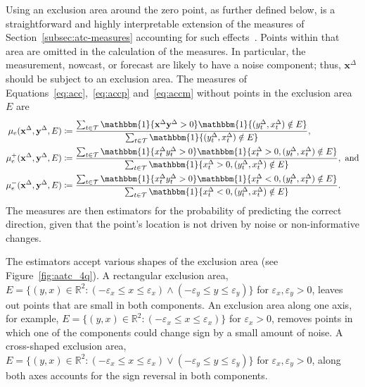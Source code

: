 \documentclass[pdflatex]{sn-jnl}
\theoremstyle{plain}%
\theoremstyle{definition}
\newcommand{\ind}[1]{\mathbbm{1}\{#1\}}
\newcommand{\R}{\mathbb{R}}
\newcommand{\diffx}{\mathbf{x}^{\Delta}}
\newcommand{\diffy}{\mathbf{y}^{\Delta}}
\newcommand{\diffxt}[1][t]{x^{\Delta}_{#1}}
\newcommand{\diffyt}[1][t]{y^{\Delta}_{#1}}
\newcommand{\acc}{\mu}
\newcommand{\acceps}[1][e]{\acc_{#1}} %
\newcommand{\accpeps}[1][e]{\acceps[#1]^+}
\newcommand{\accmeps}[1][e]{\acceps[#1]^-}
\begin{document}
Using an exclusion area around the zero point, as further defined below, is a straightforward and highly interpretable extension of the measures of Section~\ref{subsec:atc-measures} accounting for such effects~\citep[see, e.g.,][]{Saugel2015, Critchley2010}.
Points within that area are omitted in the calculation of the measures.
In particular, the measurement, nowcast, or forecast are likely to have a noise component; thus, $\diffx$ should be subject to an exclusion area.
The measures of Equations~\eqref{eq:acc},~\eqref{eq:accp} and~\eqref{eq:accm} without points in the exclusion area $E$ are
\begin{align}
    \acceps (\diffx, \diffy, E) &\coloneqq \frac{\sum_{t \in \mathcal{T}} \ind{\diffx \diffy > 0} \ind{(\diffyt, \diffxt) \notin E}}{\sum_{t \in \mathcal{T}} \ind{(\diffyt, \diffxt) \notin E}},\label{eq:acceps}\\
    \accpeps (\diffx, \diffy, E) &\coloneqq \frac{\sum_{t \in \mathcal{T}} \ind{\diffxt \diffyt > 0} \ind{\diffxt > 0, (\diffyt, \diffxt) \notin E}}{\sum_{t \in \mathcal{T}} \ind{\diffxt > 0, (\diffyt, \diffxt) \notin E}}, \ \text{and} \label{eq:accpeps}\\
    \accmeps (\diffx, \diffy, E) &\coloneqq \frac{\sum_{t \in \mathcal{T}} \ind{\diffxt \diffyt > 0} \ind{\diffxt < 0, (\diffyt, \diffxt) \notin E}}{\sum_{t \in \mathcal{T}} \ind{\diffxt < 0, (\diffyt, \diffxt) \notin E}}. \label{eq:accmeps}
\end{align}
The measures are then estimators for the probability of predicting the correct direction, given that the point's location is not driven by noise or non-informative changes.

The estimators accept various shapes of the exclusion area (see Figure~\ref{fig:aatc_4q}).
A rectangular exclusion area, $E = \{(y, x) \in \R^2: (-\varepsilon_x \leq x \leq \varepsilon_x) \land (-\varepsilon_y \leq y \leq \varepsilon_y) \}$ for $\varepsilon_x, \varepsilon_y > 0$, leaves out points that are small in both components.
An exclusion area along one axis, for example, $E = \{(y, x) \in \R^2: (-\varepsilon_x \leq x \leq \varepsilon_x)\}$ for $\varepsilon_x > 0$, removes points in which one of the components could change sign by a small amount of noise.
A cross-shaped exclusion area, $E = \{(y, x) \in \R^2: (-\varepsilon_x \leq x \leq \varepsilon_x) \lor (-\varepsilon_y \leq y \leq \varepsilon_y) \}$ for $\varepsilon_x, \varepsilon_y > 0$, along both axes accounts for the sign reversal in both components.
\end{document}
